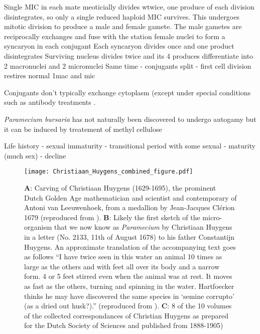 Single MIC in each mate meoticially divides wtwice, one produce of each division disintegrates, so only a single
reduced haploid MIC survives. This undergoes mitotic division to produce a male and female gamete.
The male gametes are reciprocally exchanges and fuse with the station female nuclei to form a syncaryon in each conjugant
Each syncaryon divides once and one product disintegrates 
Surviving nucleus divides twice and its 4 produces differentiate into 2 macronuclei and 2 micronuclei
Same time - conjugants split - first cell division restires normal 1mac and mic
\citep{Siegel1963} %

Conjugants don't typically exchange cytoplasm (except under special conditions such as antibody treatments \citep{Harrison1945} .
\citep{Siegel1963}



\textit{Paramecium bursaria} has not naturally been discovered to undergo autogamy \citep{Siegel1963,Yanagi2004} but it can be induced
by treatement of methyl cellulose \citep{Yanagi2004}

Life history - sexual immaturity - transitional period with some sexual - maturity (much sex) - decline


\begin{figure}[h!]
    \caption{\textbf{A}: Carving of Christiaan Huygens (1629-1695), the prominent Dutch Golden Age mathematician and scientist and contemporary of Antoni van Leeuwenhoek, from a medallion by Jean-Jacques Cl\'erion 1679 (reproduced from \citep{Huygens}). \textbf{B}: Likely the first sketch of the micro-organism that we now know as \textit{Paramecium} by Christiaan Huygens in a letter (No. 2133, 11th of August 1678) to his father Constantijn Huygens. An approximate translation of the accompanying text goes as follows ``I have twice seen in this water an animal 10 times as large as the others and with feet all over its body and a narrow form. 4 or 5 feet stirred even when the animal was at rest. It moves as fast as the others, turning and spinning in the water. Hartfoecker thinks he may have discovered the same species in `semine corrupto' (as a dried out husk?).'' (reproduced from \citep{Huygens}). \textbf{C}: 8 of the 10 volumes of the collected correspondances of Christian Huygens as prepared for the Dutch Society of Sciences and published from 1888-1905)}
    \label{fig:huygens}
\texttt{[image: Christiaan\_Huygens\_combined\_figure.pdf]}
\end{figure}




